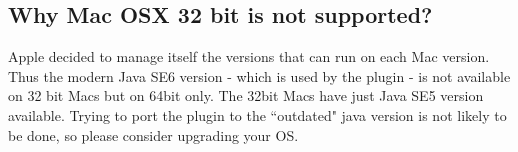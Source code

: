 \documentclass[10pt]{article}
\begin{document}
\subsection{Why Mac OSX 32 bit is not supported?}
Apple decided to manage itself the versions that can run on each Mac version. Thus the modern Java SE6 version - which is used by the plugin - is not available on 32 bit Macs but on 64bit only. The 32bit Macs have just Java SE5 version available. Trying to port the plugin to the ``outdated" java version is not likely to be done, so please consider upgrading your OS.
\end{document}
